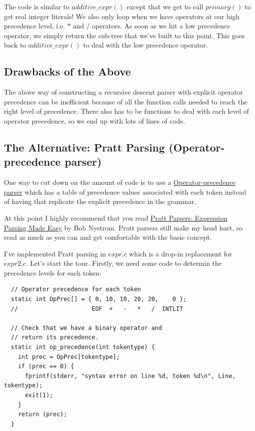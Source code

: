\documentclass[journal, onecolumn, 12pt]{IEEEtran}
\begin{document}
The code is similar to $additive\_expr()$ except that we get to call $primary()$ to get real integer literals! We also only loop when we have operators at our high precedence level, i.e. $*$ and $/$ operators. As soon as we hit a low precedence operator, we simply return the sub-tree that we've built to this point. This goes back to $additive\_expr()$ to deal with the low precedence operator.

\subsection{Drawbacks of the Above}

The above way  of constructing a recursive descent parser with explicit operator precedence can be inefficient because of all the function calls needed to reach the right level of precedence. There also has to be functions to deal with each level of operator precedence, so we end up with lots of lines of code.

\subsection{The Alternative: Pratt Parsing (Operator-precedence parser)}

One way to cut down on the amount of code is to use a \href{https://en.wikipedia.org/wiki/Operator-precedence_parser}{Operator-precedence parser} which has a table of precedence values associated with each token instead of having that replicate the explicit precedence in the grammar.

At this point I highly recommend that you read \href{https://journal.stuffwithstuff.com/2011/03/19/pratt-parsers-expression-parsing-made-easy/}{Pratt Parsers: Expression Parsing Made Easy} by Bob Nystrom. Pratt parsers still make my head hurt, so read as much as you can and get comfortable with the basic concept.

I've implemented Pratt parsing in $expr.c$ which is a drop-in replacement for $expr2.c$. Let's start the tour. Firstly, we need some code to determin the precedence levels for each token:

\begin{lstlisting}
  // Operator precedence for each token
  static int OpPrec[] = { 0, 10, 10, 20, 20,    0 };
  //                     EOF  +   -   *   /  INTLIT
  
  // Check that we have a binary operator and
  // return its precedence.
  static int op_precedence(int tokentype) {
    int prec = OpPrec[tokentype];
    if (prec == 0) {
      fprintf(stderr, "syntax error on line %d, token %d\n", Line, tokentype);
      exit(1);
    }
    return (prec);
  }
\end{lstlisting}
\end{document}
